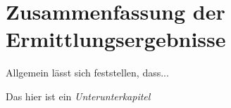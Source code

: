 \section{Zusammenfassung der Ermittlungsergebnisse}
\label{sec:ermittlungsergebnisse}
Allgemein lässt sich feststellen, dass...

Das hier ist ein \textit{Unterunterkapitel} \cite{Statista2018}
